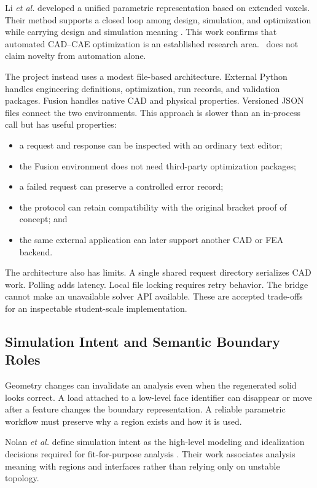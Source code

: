 Li \emph{et al.} developed a unified parametric representation based on
extended voxels. Their method supports a closed loop among design, simulation,
and optimization while carrying design and simulation meaning
\cite{li2023}. This work confirms that automated CAD--CAE optimization is an
established research area. \NEMO\ does not claim novelty from automation
alone.

The project instead uses a modest file-based architecture. External Python
handles engineering definitions, optimization, run records, and validation
packages. Fusion handles native CAD and physical properties. Versioned JSON
files connect the two environments. This approach is slower than an in-process
call but has useful properties:

\begin{itemize}
    \item a request and response can be inspected with an ordinary text editor;
    \item the Fusion environment does not need third-party optimization
    packages;
    \item a failed request can preserve a controlled error record;
    \item the protocol can retain compatibility with the original bracket
    proof of concept; and
    \item the same external application can later support another CAD or FEA
    backend.
\end{itemize}

The architecture also has limits. A single shared request directory serializes
CAD work. Polling adds latency. Local file locking requires retry behavior.
The bridge cannot make an unavailable solver API available. These are accepted
trade-offs for an inspectable student-scale implementation.

\subsection{Simulation Intent and Semantic Boundary Roles}
\label{sec:simulation-intent}

Geometry changes can invalidate an analysis even when the regenerated solid
looks correct. A load attached to a low-level face identifier can disappear or
move after a feature changes the boundary representation. A reliable
parametric workflow must preserve why a region exists and how it is used.

Nolan \emph{et al.} define simulation intent as the high-level modeling and
idealization decisions required for fit-for-purpose analysis
\cite{nolan2015}. Their work associates analysis meaning with regions and
interfaces rather than relying only on unstable topology.

